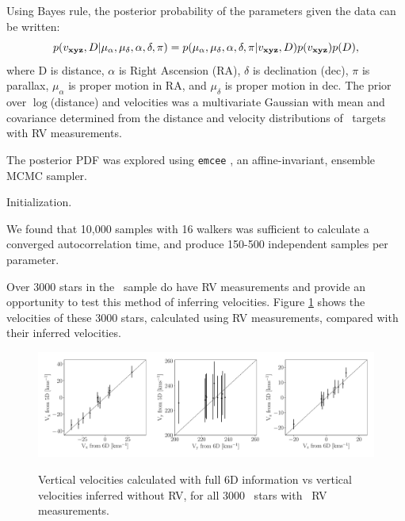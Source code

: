 Using Bayes rule, the posterior probability of the parameters given the data
can be written:
\begin{equation}
p(v_{\bf xyz}, D | \mu_{\alpha}, \mu_{\delta}, \alpha, \delta, \pi) =
    p(\mu_{\alpha}, \mu_{\delta}, \alpha, \delta, \pi | v_{\bf xyz}, D)
    p(v_{\bf xyz}) p(D),
\end{equation}
where D is distance, $\alpha$ is Right Ascension (RA), $\delta$ is declination
(dec), $\pi$ is parallax, $\mu_\alpha$ is proper motion in RA, and
$\mu_\delta$ is proper motion in dec.
The prior over $\log$(distance) and velocities was a multivariate Gaussian
with mean and covariance determined from the distance and velocity
distributions of \kepler\ targets with RV measurements.

The posterior PDF was explored using {\tt emcee} \citep{forman-mackey2013}, an
affine-invariant, ensemble MCMC sampler.

Initialization.

We found that 10,000 samples with 16 walkers was sufficient to calculate a
converged autocorrelation time, and produce 150-500 independent samples per
parameter.

Over 3000 stars in the \mct\ sample do have RV measurements and provide an
opportunity to test this method of inferring velocities.
Figure \ref{fig:v_comparison} shows the velocities of these 3000 stars,
calculated using RV measurements, compared with their inferred velocities.

\begin{figure}[ht!]
\caption{Vertical velocities calculated with full 6D information vs vertical
    velocities inferred without RV, for all 3000 \mct\ stars with \gaia\ RV
    measurements.}
  \centering
    \includegraphics[width=1\textwidth]{v_comparison}
\label{fig:v_comparison}
\end{figure}

